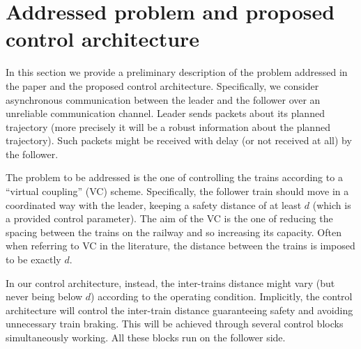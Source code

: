 \documentclass[letterpaper, 10 pt, conference]{ieeeconf}
\theoremstyle{definition}
\theoremstyle{nopoint}
\begin{document}
   
	
	





\section{Addressed problem and proposed control architecture}
 \label{sec:proposedarchitecture}

In this section we provide a preliminary description of the problem addressed in the paper and the proposed control architecture. 
Specifically, we consider asynchronous communication between the leader and the follower over an unreliable communication channel. 
Leader sends packets about its planned trajectory (more precisely it will be a robust information about the planned trajectory). Such packets might be received with delay (or not received at all) by the follower. 

The problem to be addressed is the one of controlling the trains according to a ``virtual coupling'' (VC) scheme. Specifically, the follower train should move in a coordinated way with the leader, keeping a safety distance of at least $d$ (which is a provided control parameter). The aim of the VC is the one of reducing the spacing between the trains on the railway and so increasing its capacity. 
Often when referring to VC in the literature, the distance between the trains is imposed to be exactly $d$. 

In our control architecture, instead, the inter-trains distance might vary (but never being below $d$) according to the operating condition. Implicitly, the control architecture will  control the inter-train distance guaranteeing safety and avoiding unnecessary train braking. 
This will be achieved through several control blocks simultaneously working. All these blocks run on the follower side. 
\end{document}
